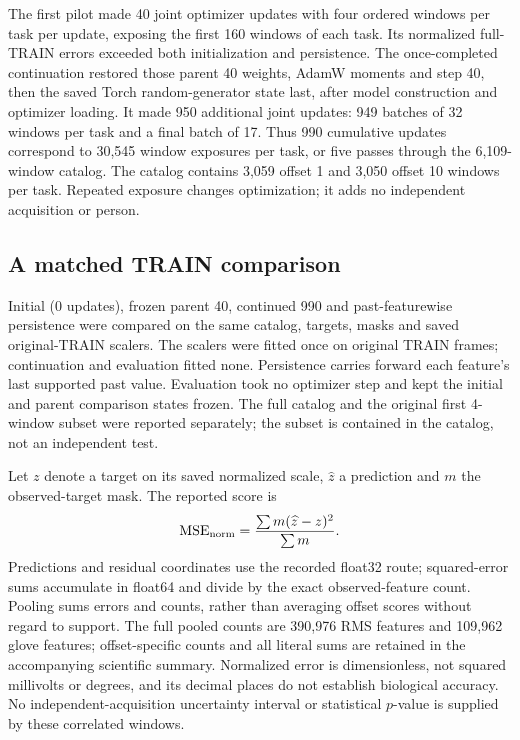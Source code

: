 The first pilot made 40 joint optimizer updates with four ordered windows per task per update, exposing the first 160 windows of each task. Its normalized full-TRAIN errors exceeded both initialization and persistence. The once-completed continuation restored those parent 40 weights, AdamW moments and step 40, then the saved Torch random-generator state last, after model construction and optimizer loading. It made 950 additional joint updates: 949 batches of 32 windows per task and a final batch of 17. Thus 990 cumulative updates correspond to 30,545 window exposures per task, or five passes through the 6,109-window catalog. The catalog contains 3,059 offset 1 and 3,050 offset 10 windows per task. Repeated exposure changes optimization; it adds no independent acquisition or person.

\subsection{A matched TRAIN comparison}
Initial (0 updates), frozen parent 40, continued 990 and past-featurewise persistence were compared on the same catalog, targets, masks and saved original-TRAIN scalers. The scalers were fitted once on original TRAIN frames; continuation and evaluation fitted none. Persistence carries forward each feature's last supported past value. Evaluation took no optimizer step and kept the initial and parent comparison states frozen. The full catalog and the original first 4-window subset were reported separately; the subset is contained in the catalog, not an independent test.

Let $z$ denote a target on its saved normalized scale, $\widehat z$ a prediction and $m$ the observed-target mask. The reported score is
\[
 \operatorname{MSE}_{\rm norm}=\frac{\sum m(\widehat z-z)^2}{\sum m}.
\]
Predictions and residual coordinates use the recorded float32 route; squared-error sums accumulate in float64 and divide by the exact observed-feature count. Pooling sums errors and counts, rather than averaging offset scores without regard to support. The full pooled counts are 390,976 RMS features and 109,962 glove features; offset-specific counts and all literal sums are retained in the accompanying scientific summary. Normalized error is dimensionless, not squared millivolts or degrees, and its decimal places do not establish biological accuracy. No independent-acquisition uncertainty interval or statistical $p$-value is supplied by these correlated windows.




